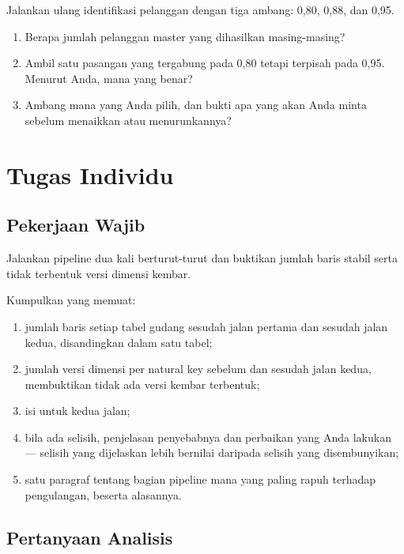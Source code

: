 
Jalankan ulang identifikasi pelanggan dengan tiga ambang: 0,80, 0,88, dan 0,95.

\begin{enumerate}[leftmargin=1.4em]
  \item Berapa jumlah pelanggan master yang dihasilkan masing-masing?
  \item Ambil satu pasangan yang tergabung pada 0,80 tetapi terpisah pada 0,95.
        Menurut Anda, mana yang benar?
  \item Ambang mana yang Anda pilih, dan bukti apa yang akan Anda minta sebelum
        menaikkan atau menurunkannya?
\end{enumerate}

\section{Tugas Individu}

\subsection{Pekerjaan Wajib}
Jalankan pipeline dua kali berturut-turut dan buktikan jumlah baris stabil serta
tidak terbentuk versi dimensi kembar.

Kumpulkan  yang memuat:

\begin{enumerate}[leftmargin=1.4em]
  \item jumlah baris setiap tabel gudang sesudah jalan pertama dan sesudah
        jalan kedua, disandingkan dalam satu tabel;
  \item jumlah versi dimensi per natural key sebelum dan sesudah jalan kedua,
        membuktikan tidak ada versi kembar terbentuk;
  \item isi  untuk kedua jalan;
  \item bila ada selisih, penjelasan penyebabnya dan perbaikan yang Anda
        lakukan --- selisih yang dijelaskan lebih bernilai daripada selisih
        yang disembunyikan;
  \item satu paragraf tentang bagian pipeline mana yang paling rapuh terhadap
        pengulangan, beserta alasannya.
\end{enumerate}

\subsection{Pertanyaan Analisis}

